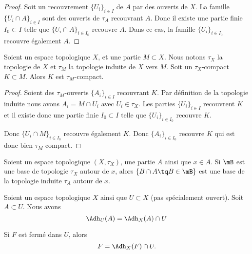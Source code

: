 \begin{proof}
	Soit un recouvrement \( \{ U_i \}_{i\in I}\) de \( A\) par des ouverts de \( X\). La famille \( \{ U_i\cap A \}_{i\in I}\) sont des ouverts de \( \tau_A\) recouvrant \( A\). Donc il existe une partie finie \( I_0\subset I\) telle que \( \{ U_i\cap A \}_{i\in I_0}\) recouvre \( A\). Dans ce cas, la famille \( \{ U_i \}_{i\in I_0}\) recouvre également \( A\).
\end{proof}

\begin{proposition}	\label{PROPooBKPEooQupIUx}
	Soient un espace topologique \( X\), et une partie \( M\subset X\). Nous notons \( \tau_X\) la topologie de \( X\) et \( \tau_M\) la topologie induite de \( X\) vers \( M\). Soit un \( \tau_X\)-compact \( K\subset M\). Alors \( K\) est \( \tau_M\)-compact.
\end{proposition}

\begin{proof}
	Soient des \( \tau_M\)-ouverts \( \{ A_i \}_{i\in I} \) recouvrant \( K\). Par définition de la topologie induite nous avons \( A_i=M\cap U_i\) avec \( U_i\in \tau_X\). Les parties \( \{ U_i \}_{i\in I}\) recouvrent \( K\) et il existe donc une partie finie \( I_0\subset I\) telle que \( \{ U_i \}_{i\in I_0}\) recouvre \( K\).

	Donc \( \{ U_i\cap M \}_{i\in I_0} \) recouvre également \( K\). Donc \( \{ A_i \}_{i\in I_0}\) recouvre \( K\) qui est donc bien \( \tau_M\)-compact.
\end{proof}

\begin{proposition}	\label{PROPooHQHWooFHHAXP}
	Soient un espace topologique \( (X,\tau_X)\), une partie \( A\) ainsi que \( x\in A\). Si \( \mB\) est une base de topologie \( \tau_X\) autour de \( x\), alors \( \{ B\cap A\tq B\in\mB \}\) est une base de la topologie induite \( \tau_A\) autour de \( x\).
\end{proposition}


\begin{lemma}	\label{LEMooCXHEooKNmLma}
	Soient un espace topologique \( X\) ainsi que \( U\subset X\) (pas spécialement ouvert). Soit \( A\subset U\). Nous avons
	\begin{equation}
		\Adh_U(A)=\Adh_X(A)\cap U
	\end{equation}

	Si \( F\) est fermé dans \( U\), alors
	\begin{equation}		\label{EQooMZOOooKHfZTk}
		F=\Adh_X(F)\cap U.
	\end{equation}
\end{lemma}

